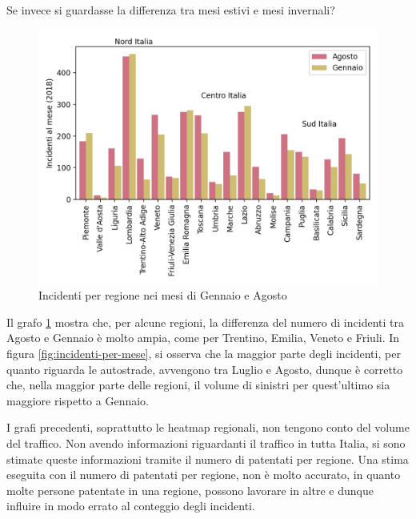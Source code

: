 \documentclass[a4paper]{report}
\begin{document}
Se invece si guardasse la differenza tra mesi estivi e mesi invernali?

\begin{figure}
    \includegraphics[width=\linewidth]{../src/incidenti/incidenti_aci/mappe_regioni/incidenti_estate_inverno.png}
    \caption{Incidenti per regione nei mesi di Gennaio e Agosto}
    \label{fig:incidenti-estate-inverno}
\end{figure}

Il grafo \ref{fig:incidenti-estate-inverno} mostra che, per alcune regioni, la differenza del  
numero di incidenti tra Agosto e Gennaio è molto ampia, come per Trentino, Emilia, Veneto e Friuli.
In figura \ref{fig:incidenti-per-mese}, si osserva che la maggior parte degli incidenti, 
per quanto riguarda le autostrade, avvengono tra Luglio e Agosto, dunque è corretto che,  
nella maggior parte delle regioni, il volume di sinistri per quest'ultimo sia maggiore rispetto a Gennaio. 

I grafi precedenti, soprattutto le heatmap regionali, non tengono conto del volume del traffico.
Non avendo informazioni riguardanti il traffico in tutta Italia, si sono stimate queste informazioni 
tramite il numero di patentati per regione.
Una stima eseguita con il numero di patentati per regione, non è molto accurato, 
in quanto molte persone patentate in una regione, possono lavorare in altre e dunque influire 
in modo errato al conteggio degli incidenti. 
\end{document}
